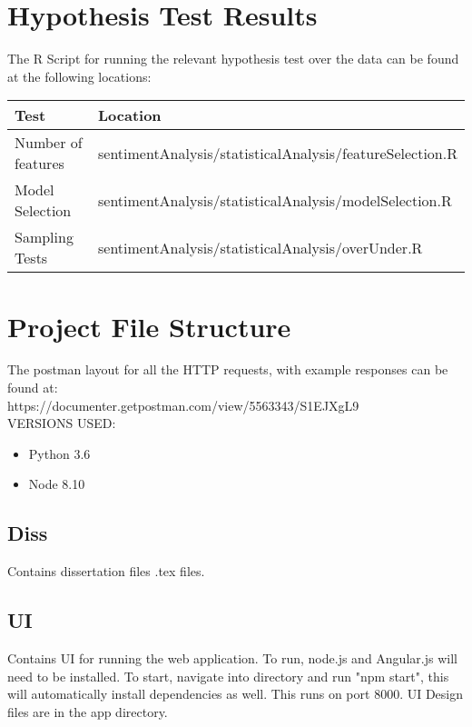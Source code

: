 
\begin{appendices}

\section{Hypothesis Test Results}
\label{appendix:hypothesis}
The R Script for running the relevant hypothesis test over the data can be found at the following locations:
\begin{center}

\begin{tabular}{|l|l|}
\hline
 Test &  Location\\ \hline
 Number of features &  sentimentAnalysis/statisticalAnalysis/featureSelection.R\\
 Model Selection &  sentimentAnalysis/statisticalAnalysis/modelSelection.R\\
 Sampling Tests &  sentimentAnalysis/statisticalAnalysis/overUnder.R\\ \hline
\end{tabular}
\end{center}

\section{Project File Structure}

The postman layout for all the HTTP requests, with example responses can be found at:
\\ https://documenter.getpostman.com/view/5563343/S1EJXgL9
\\ 
VERSIONS USED: 
\begin{itemize}
    \item Python 3.6
    \item Node  8.10
\end{itemize}

\subsection{Diss}
Contains dissertation files .tex files.

\subsection{UI}
Contains UI for running the web application.  To run, node.js and Angular.js will need to be installed.
To start, navigate into directory and run "npm start", this will automatically install dependencies as well.
This runs on port 8000.
UI Design files are in the app directory.


\end{appendices}
